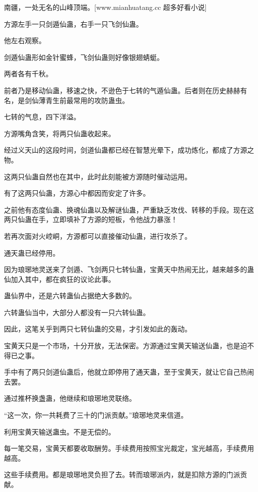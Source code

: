 
\begin{this_body}

南疆，一处无名的山峰顶端。[www.mianhuatang.cc 超多好看小说]

方源左手一只剑遁仙蛊，右手一只飞剑仙蛊。

他左右观察。

剑遁仙蛊形如金针蜜蜂，飞剑仙蛊则好像银翅蜻蜓。

两者各有千秋。

前者乃是移动仙蛊，移速之快，不逊色于七转的气遁仙蛊。后者则在历史赫赫有名，是剑仙薄青生前最常用的攻防蛊虫。

七转的气息，四下洋溢。

方源嘴角含笑，将两只仙蛊收起来。

经过义天山的这段时间，剑道仙蛊都已经在智慧光晕下，成功炼化，都成了方源之物。

这两只仙蛊自然也在其中，此时此刻能被方源随时催动运用。

有了这两只仙蛊，方源心中都因而安定了许多。

之前他有态度仙蛊、换魂仙蛊以及解谜仙蛊，严重缺乏攻伐、转移的手段。现在这两只仙蛊在手，立即填补了方源的短板，令他战力暴涨！

若再次面对火崆峒，方源都可以直接催动仙蛊，进行攻杀了。

通天蛊已经停用。

因为琅琊地灵送来了剑遁、飞剑两只七转仙蛊，宝黄天中热闹无比，越来越多的蛊仙加入其中，都在疯狂的议论此事。

蛊仙界中，还是六转蛊仙占据绝大多数的。

六转蛊仙当中，大部分人都没有一只六转仙蛊。

因此，这笔关乎到两只七转仙蛊的交易，才引发如此的轰动。

宝黄天只是一个市场，十分开放，无法保密。方源通过宝黄天输送仙蛊，也是迫不得已之事。

手中有了两只剑道仙蛊后，他就立即停用了通天蛊，至于宝黄天，就让它自己热闹去罢。

通过推杯换盏蛊，他继续和琅琊地灵联络。

“这一次，你一共耗费了三十的门派贡献。”琅琊地灵来信道。

利用宝黄天输送蛊虫。不是无偿的。

每一笔交易，宝黄天都要收取酬劳。手续费用按照宝光裁定，宝光越高，手续费用越高。

这些手续费用。都是琅琊地灵负担了去。转而琅琊派内，就是扣除方源的门派贡献。


\end{this_body}
